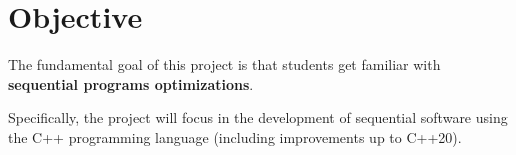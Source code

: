 \section{Objective}

The fundamental goal of this project is that students
get familiar with \textbf{sequential programs optimizations}.

Specifically, the project will focus in the development of
sequential software using the C++ programming language
(including improvements up to C++20).
